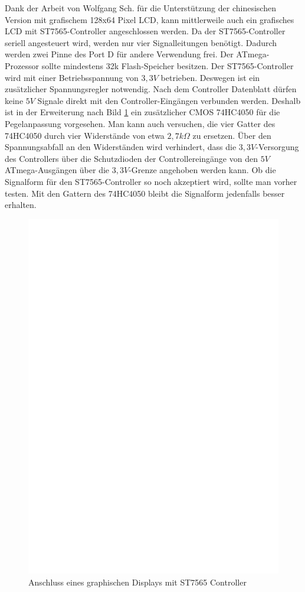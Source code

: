 Dank der Arbeit von Wolfgang Sch. für die Unterstützung der chinesischen Version mit
grafischem 128x64 Pixel LCD, kann mittlerweile auch ein grafisches LCD
mit ST7565-Controller angeschlossen werden. Da der ST7565-Controller seriell angesteuert wird,
werden nur vier Signalleitungen benötigt.
Dadurch werden zwei Pinne des Port D für andere Verwendung frei.
Der ATmega-Prozessor sollte mindestens 32k Flash-Speicher besitzen.
Der ST7565-Controller wird mit einer Betriebsspannung von \(3,3V\) betrieben.
Deswegen ist ein zusätzlicher Spannungsregler notwendig.
Nach dem Controller Datenblatt dürfen keine \(5V\) Signale direkt mit den Controller-Eingängen verbunden
werden. Deshalb ist in der Erweiterung nach Bild \ref{fig:ST7565lcd} ein zusätzlicher CMOS 74HC4050
für die Pegelanpassung vorgesehen. 
Man kann auch versuchen, die vier Gatter des 74HC4050 durch vier Widerstände von etwa \(2,7k\Omega\) zu ersetzen.
Über den Spannungsabfall an den Widerständen wird verhindert, dass die \(3,3V\)-Versorgung des Controllers über die Schutzdioden
der Controllereingänge von den \(5V\) ATmega-Ausgängen über die \(3,3V\)-Grenze angehoben werden kann.
Ob die Signalform für den ST7565-Controller so noch akzeptiert wird, sollte man vorher testen.
Mit den Gattern des 74HC4050 bleibt die Signalform jedenfalls besser erhalten.\\
 
\begin{figure}[H]
\centering
\includegraphics[width=14cm]{../FIG/ST7565lcd.eps}
\caption{Anschluss eines graphischen Displays mit ST7565 Controller}
\label{fig:ST7565lcd}
\end{figure}

